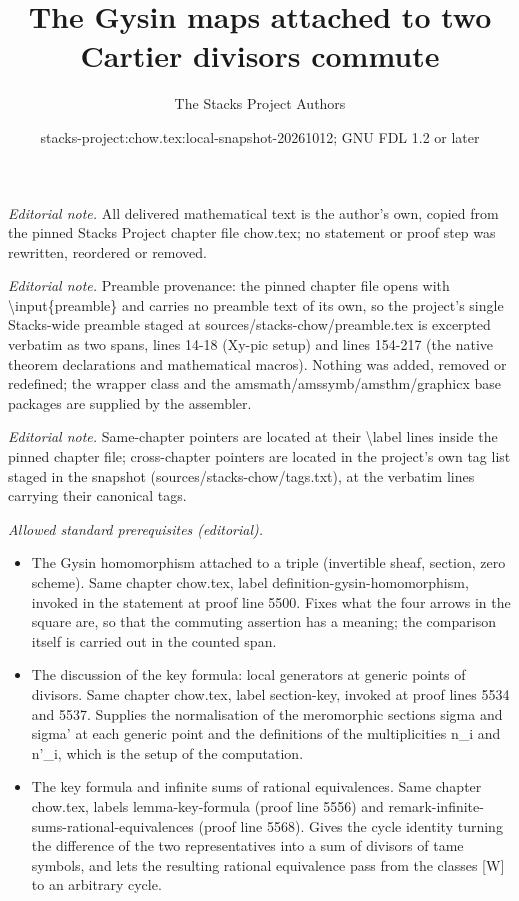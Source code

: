 \documentclass[10pt,a4paper]{amsart}
\title{The Gysin maps attached to two Cartier divisors commute}
\author{The Stacks Project Authors}
\date{stacks-project:chow.tex:local-snapshot-20261012; GNU FDL 1.2 or later}
\theoremstyle{plain}
\theoremstyle{definition}
\theoremstyle{remark}
\numberwithin{equation}{subsection}
\begin{document}
\maketitle
\noindent\textit{Editorial note.} All delivered mathematical text is the author's own, copied from the pinned Stacks Project chapter file chow.tex; no statement or proof step was rewritten, reordered or removed.\par\medskip
\noindent\textit{Editorial note.} Preamble provenance: the pinned chapter file opens with \textbackslash{}input\{preamble\} and carries no preamble text of its own, so the project's single Stacks-wide preamble staged at sources/stacks-chow/preamble.tex is excerpted verbatim as two spans, lines 14-18 (Xy-pic setup) and lines 154-217 (the native theorem declarations and mathematical macros). Nothing was added, removed or redefined; the wrapper class and the amsmath/amssymb/amsthm/graphicx base packages are supplied by the assembler.\par\medskip
\noindent\textit{Editorial note.} Same-chapter pointers are located at their \textbackslash{}label lines inside the pinned chapter file; cross-chapter pointers are located in the project's own tag list staged in the snapshot (sources/stacks-chow/tags.txt), at the verbatim lines carrying their canonical tags.\par\medskip
\noindent\textit{Allowed standard prerequisites (editorial).}\begin{itemize}
\item The Gysin homomorphism attached to a triple (invertible sheaf, section, zero scheme). Same chapter chow.tex, label definition-gysin-homomorphism, invoked in the statement at proof line 5500. Fixes what the four arrows in the square are, so that the commuting assertion has a meaning; the comparison itself is carried out in the counted span.
\item The discussion of the key formula: local generators at generic points of divisors. Same chapter chow.tex, label section-key, invoked at proof lines 5534 and 5537. Supplies the normalisation of the meromorphic sections sigma and sigma' at each generic point and the definitions of the multiplicities n\_i and n'\_i, which is the setup of the computation.
\item The key formula and infinite sums of rational equivalences. Same chapter chow.tex, labels lemma-key-formula (proof line 5556) and remark-infinite-sums-rational-equivalences (proof line 5568). Gives the cycle identity turning the difference of the two representatives into a sum of divisors of tame symbols, and lets the resulting rational equivalence pass from the classes [W] to an arbitrary cycle.
\end{itemize}\medskip
\end{document}
